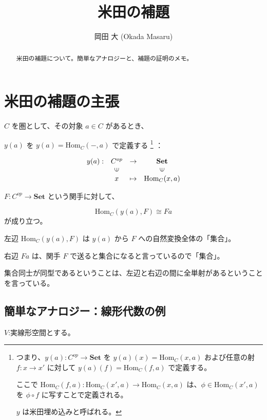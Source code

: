 \documentclass[uplatex,a4j,12pt,dvipdfmx]{jsarticle}
\title{
米田の補題
}
\author{
岡田 大 (Okada Masaru)
}
\begin{document}
\maketitle

\begin{abstract}
	米田の補題について。簡単なアナロジーと、補題の証明のメモ。
\end{abstract}

\section{米田の補題の主張}

$C$ を圏として、その対象 $a \in C$ があるとき、

$y(a)$ を $y(a) = \text{Hom}_{C}(-,a)$ で定義する
\footnote{
	つまり、$y(a) : C^{op} \to \textbf{Set}$ を $y(a)(x) = \text{Hom}_{C}(x,a)$ および任意の射 $f: x \to x'$ に対して $y(a)(f) = \text{Hom}_{C}(f,a)$ で定義する。

	ここで $\text{Hom}_{C}(f,a): \text{Hom}_{C}(x',a) \to \text{Hom}_{C}(x,a)$ は、$\phi \in \text{Hom}_{C}(x',a)$ を $\phi \circ f$ に写すことで定義される。

    $y$ は米田埋め込みと呼ばれる。
}
：

\[
	\begin{array}{cccc}
		y(a) : & C^{op}                  & \to     & \textbf{Set}            \\
		       & \rotatebox{90}{${\in}$} &         & \rotatebox{90}{${\in}$} \\
		       & x                       & \mapsto & \text{Hom}_{C}(x,a)
	\end{array}
\]


$F: C^{op} \to \textbf{Set}$ という関手に対して、

\[
	\text{Hom}_{C}(y(a),F) \cong Fa
\]
が成り立つ。

左辺
$\text{Hom}_{C}(y(a),F)$
は $y(a)$ から $F$ への自然変換全体の「集合」。

右辺 $Fa$ は、関手 $F$ で送ると集合になると言っているので「集合」。

集合同士が同型であるということは、左辺と右辺の間に全単射があるということを言っている。



\subsection{簡単なアナロジー：線形代数の例}

$V$:実線形空間とする。
\end{document}
